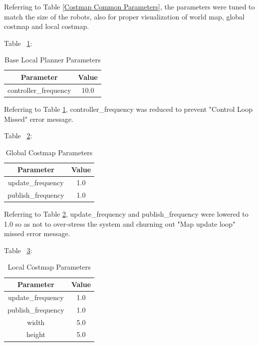 \documentclass[10pt,journal,compsoc]{IEEEtran}
\begin{document}
Referring to Table \ref{Costmap Common Parameters}, the parameters were tuned to match the size of the robots, also for proper visualization of world map, global costmap and local costmap.

Table ~\ref{Base Local Planner Parameters}:
\begin{table}[h]
\setlength{\tabcolsep}{1pt}  %
\caption{Base Local Planner Parameters}
\label{Base Local Planner Parameters}
\begin{center}
\begin{tabular}{|c||c|}
\hline
Parameter & Value\\
\hline
controller\_frequency & 10.0\\
\hline
\end{tabular}
\end{center}
\end{table}

Referring to Table \ref{Base Local Planner Parameters}, controller\_frequency was reduced to prevent "Control Loop Missed" error message.

Table ~\ref{Global Costmap Parameters}:
\begin{table}[h]
\setlength{\tabcolsep}{1pt}  %
\caption{Global Costmap Parameters}
\label{Global Costmap Parameters}
\begin{center}
\begin{tabular}{|c||c|}
\hline
Parameter & Value\\
\hline
update\_frequency & 1.0\\
\hline
publish\_frequency & 1.0\\
\hline
\end{tabular}
\end{center}
\end{table}

Referring to Table \ref{Global Costmap Parameters}, update\_frequency and publish\_frequency were lowered to 1.0 so as not to over-stress the system and churning out "Map update loop" missed error message.

Table ~\ref{Local Costmap Parameters}:
\begin{table}[h]
\setlength{\tabcolsep}{1pt}  %
\caption{Local Costmap Parameters}
\label{Local Costmap Parameters}
\begin{center}
\begin{tabular}{|c||c|}
\hline
Parameter & Value\\
\hline
update\_frequency & 1.0\\
\hline
publish\_frequency & 1.0\\
\hline
width & 5.0\\
\hline
height & 5.0\\
\hline
\end{tabular}
\end{center}
\end{table}
\end{document}
